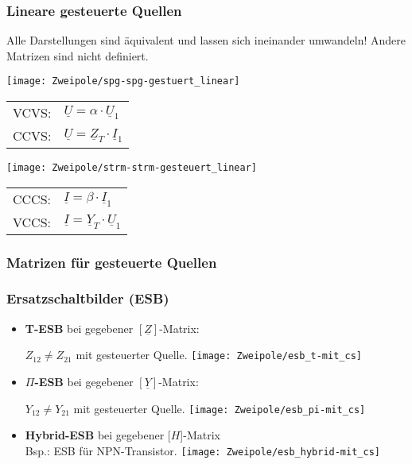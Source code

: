 \subsubsection{Lineare gesteuerte Quellen}
Alle Darstellungen sind äquivalent und lassen sich ineinander umwandeln! Andere Matrizen sind nicht definiert.\\
    \begin{minipage}{0.5\columnwidth}
    	\renewcommand{\arraystretch}{1.3}
        \texttt{[image: Zweipole/spg-spg-gestuert\_linear]}\\
    \begin{tabular}{ll}
        VCVS:& $\underline{U}=\alpha\cdot \underline{U}_1$\\
        CCVS:& $\underline{U}=\underline{Z}_T\cdot \underline{I}_1 $
    \end{tabular}
    \end{minipage}
    \begin{minipage}{0.5\columnwidth}
    	\renewcommand{\arraystretch}{1.3}
        \texttt{[image: Zweipole/strm-strm-gesteuert\_linear]}\\
    \begin{tabular}{ll}
        CCCS:& $\underline{I}=\beta\cdot \underline{I}_1$\\
        VCCS:& $\underline{I}=\underline{Y}_T\cdot \underline{U}_1$
    \end{tabular}
    \end{minipage}
    
 \subsubsection{Matrizen für gesteuerte Quellen}   

\subsubsection{Ersatzschaltbilder (ESB)}
\begin{itemize}
    \item \textbf{T-ESB} bei gegebener $[\underline{Z}]$-Matrix:
   
    	$Z_{12} \neq Z_{21}$ mit gesteuerter Quelle. 
        \texttt{[image: Zweipole/esb\_t-mit\_cs]}
        \raggedright
        
    \item \textbf{$\Pi$-ESB} bei gegebener $[\underline{Y}]$-Matrix:
    
        $Y_{12} \neq Y_{21}$ mit gesteuerter Quelle.
        \texttt{[image: Zweipole/esb\_pi-mit\_cs]}
        \raggedright
        
    \item  \textbf{Hybrid-ESB} bei gegebener [\underline{$H$}]-Matrix\\
    {\footnotesize Bsp.: ESB für NPN-Transistor.}
        \texttt{[image: Zweipole/esb\_hybrid-mit\_cs]}
\end{itemize}

